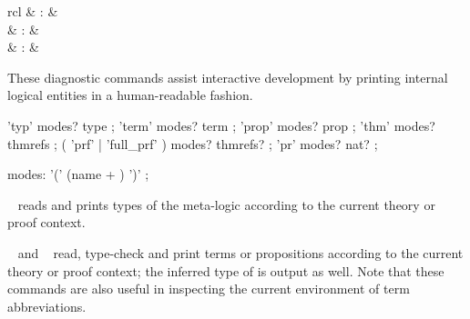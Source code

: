 \begin{isabellebody}
\begin{isamarkuptext}
\begin{matharray}{rcl}
    \hypertarget{command.prf}{\hyperlink{command.prf}{\mbox{}}} & : &  \\
    \hypertarget{command.full-prf}{\hyperlink{command.full-prf}{\mbox{}}} & : &  \\
    \hypertarget{command.pr}{\hyperlink{command.pr}{\mbox{}}} & : &  \\
  \end{matharray}

  These diagnostic commands assist interactive development by printing
  internal logical entities in a human-readable fashion.

  \begin{rail}
    'typ' modes? type
    ;
    'term' modes? term
    ;
    'prop' modes? prop
    ;
    'thm' modes? thmrefs
    ;
    ( 'prf' | 'full_prf' ) modes? thmrefs?
    ;
    'pr' modes? nat?
    ;

    modes: '(' (name + ) ')'
    ;
  \end{rail}

  \begin{description}

  \item \hyperlink{command.typ}{\mbox{}}~ reads and prints types of the
  meta-logic according to the current theory or proof context.

  \item \hyperlink{command.term}{\mbox{}}~ and \hyperlink{command.prop}{\mbox{}}~
  read, type-check and print terms or propositions according to the
  current theory or proof context; the inferred type of  is
  output as well.  Note that these commands are also useful in
  inspecting the current environment of term abbreviations.


\end{description}
\end{isamarkuptext}
\end{isabellebody}

